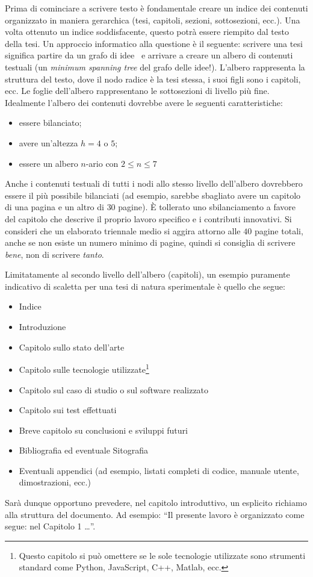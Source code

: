 \documentclass[12pt]{report}
\begin{document}
Prima di cominciare a scrivere testo \`e fondamentale creare un indice dei contenuti organizzato in maniera gerarchica (tesi, capitoli, sezioni, sottosezioni, ecc.). Una volta ottenuto un indice soddisfacente, questo potr\`a essere riempito dal testo della tesi. 
Un approccio informatico alla questione \`e il seguente: scrivere una tesi significa partire da un grafo di idee~\cite{hamalainen2019web} e arrivare a creare un albero di contenuti testuali (un \textit{minimum spanning tree} del grafo delle idee!). L'albero rappresenta la struttura del testo, dove il nodo radice \`e la tesi stessa, i suoi figli sono i capitoli, ecc. Le foglie dell'albero rappresentano le sottosezioni di livello pi\`u fine.  
%
Idealmente l'albero dei contenuti dovrebbe avere le seguenti caratteristiche:
\begin{itemize}
\item essere bilanciato;
\item avere un'altezza $h=4$ o $5$; 
\item essere un albero $n$-ario con $2\leq n \leq 7$
\end{itemize}
Anche i contenuti testuali di tutti i nodi allo stesso livello dell'albero dovrebbero essere il pi\`u possibile bilanciati (ad esempio, sarebbe sbagliato avere un capitolo di una pagina e un altro di $30$ pagine).
\`{E} tollerato uno sbilanciamento a favore del capitolo che descrive il proprio lavoro specifico e i  contributi innovativi. Si consideri che un elaborato triennale medio si aggira attorno alle $40$ pagine totali, anche se non esiste un numero minimo di pagine, quindi si consiglia di scrivere \textit{bene}, non di scrivere \textit{tanto}.

Limitatamente al secondo livello dell'albero (capitoli), un esempio puramente indicativo di scaletta per una tesi di natura sperimentale è quello che segue:
\begin{itemize}
    \item Indice
    \item Introduzione
    \item Capitolo sullo stato dell'arte
    \item Capitolo sulle tecnologie utilizzate\footnote{Questo capitolo si può omettere se le sole tecnologie utilizzate sono strumenti standard come Python, JavaScript, C++, Matlab, ecc.}
    \item Capitolo sul caso di studio o sul software realizzato
    \item Capitolo sui test effettuati
    \item Breve capitolo su conclusioni e sviluppi futuri
    \item Bibliografia ed eventuale Sitografia
    \item Eventuali appendici (ad esempio, listati completi di codice, manuale utente, dimostrazioni, ecc.)
\end{itemize}
Sarà dunque opportuno prevedere, nel capitolo introduttivo, un esplicito richiamo alla struttura del documento. Ad esempio: ``Il presente lavoro \`{e} organizzato come segue: nel Capitolo 1 \dots''.
\end{document}
